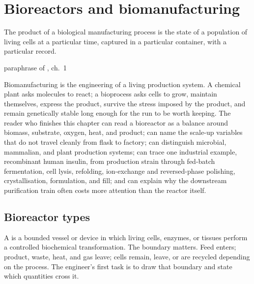 \chapter{Bioreactors and biomanufacturing}
\label{vol06:ch10}

\epigraph{The product of a biological manufacturing process is the
state of a population of living cells at a particular time, captured
in a particular container, with a particular record.}{paraphrase of
\cite{text:v6c10-shuler-bioprocess-2017}, ch.~1}


\noindent
Biomanufacturing is the engineering of a living production system. A
chemical plant asks molecules to react; a bioprocess asks cells to grow,
maintain themselves, express the product, survive the stress imposed by
the product, and remain genetically stable long enough for the run to be
worth keeping. The reader who finishes this chapter can read a
bioreactor as a balance around biomass, substrate, oxygen, heat, and
product; can name the scale-up variables that do not travel cleanly from
flask to factory; can distinguish microbial, mammalian, and plant
production systems; can trace one industrial example, recombinant human
insulin, from production strain through fed-batch fermentation, cell
lysis, refolding, ion-exchange and reversed-phase polishing,
crystallisation, formulation, and fill; and can explain why the
downstream purification train often costs more attention than the
reactor itself.

\section{Bioreactor types}

A  is a bounded vessel or device in which living
cells, enzymes, or tissues perform a controlled biochemical
transformation. The boundary matters. Feed enters; product, waste, heat,
and gas leave; cells remain, leave, or are recycled depending on the
process. The engineer's first task is to draw that boundary and state
which quantities cross it.

